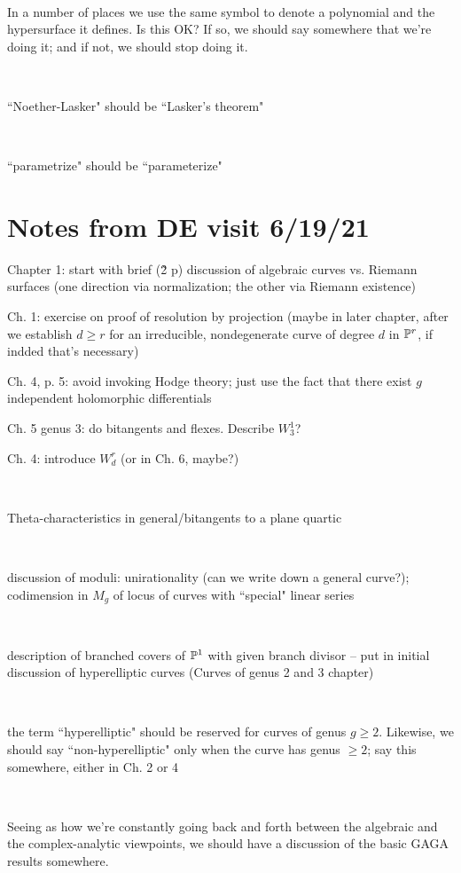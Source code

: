 \documentclass[12pt, leqno]{book}
\begin{document}
\

In a number of places we use the same symbol to denote a polynomial and the hypersurface it defines. Is this OK? If so, we should say somewhere that we're doing it; and if not, we should stop doing it.

\

``Noether-Lasker" should be ``Lasker's theorem"

\

``parametrize" should be ``parameterize"

\section{Notes from DE visit 6/19/21}

Chapter 1: start with brief (\~2 p) discussion of algebraic curves vs. Riemann surfaces (one direction via normalization; the other via Riemann existence)

Ch. 1: exercise on proof of resolution by projection (maybe in later chapter, after we establish $d \geq r$ for an irreducible, nondegenerate  curve of degree $d$ in ${\mathbb P}^r$, if indded that's necessary)

Ch. 4, p. 5: avoid invoking Hodge theory; just use the fact that there exist $g$ independent holomorphic differentials


Ch. 5 genus 3: do bitangents and flexes. Describe $W^1_3$?

Ch. 4: introduce $W^r_d$ (or in Ch. 6, maybe?)

\

Theta-characteristics in general/bitangents to a plane quartic

\

discussion of moduli: unirationality (can we write down a general curve?); codimension in $M_g$ of locus of curves with ``special" linear series

\

description of branched covers of ${\mathbb P}^1$ with given branch divisor -- put in initial discussion of hyperelliptic curves (Curves of genus 2 and 3 chapter)

\

the term ``hyperelliptic" should be reserved for curves of genus $g \geq 2$. Likewise, we should say ``non-hyperelliptic" only when the curve has genus $\geq 2$; say this somewhere, either in Ch. 2 or 4

\

Seeing as how we're constantly going back and forth between the algebraic and the complex-analytic viewpoints,  we should have a discussion of the basic GAGA results somewhere.
\end{document}
